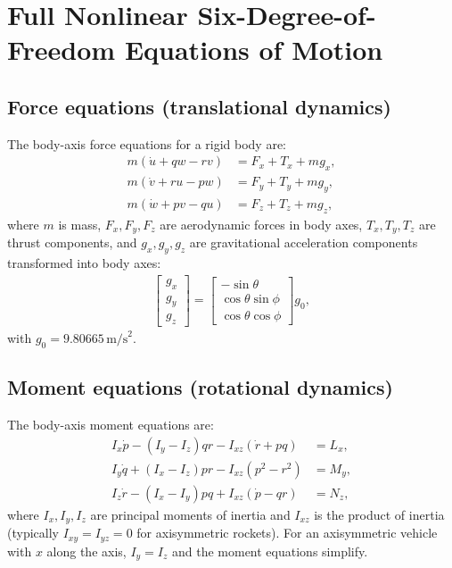 \documentclass[11pt]{article}
\begin{document}
\section{Full Nonlinear Six-Degree-of-Freedom Equations of Motion}

\subsection{Force equations (translational dynamics)}
The body-axis force equations for a rigid body are:
\begin{align}
m(\dot u + qw - rv) &= F_x + T_x + m g_x,\\
m(\dot v + ru - pw) &= F_y + T_y + m g_y,\\
m(\dot w + pv - qu) &= F_z + T_z + m g_z,
\end{align}
where $m$ is mass, $F_x, F_y, F_z$ are aerodynamic forces in body axes, $T_x, T_y, T_z$ are thrust components, and $g_x, g_y, g_z$ are gravitational acceleration components transformed into body axes:
\begin{align}
\begin{bmatrix}g_x\\g_y\\g_z\end{bmatrix}
=
\begin{bmatrix}
-\sin\theta\\
\cos\theta\sin\phi\\
\cos\theta\cos\phi
\end{bmatrix}g_0,
\end{align}
with $g_0=9.80665\,\text{m/s}^2$.

\subsection{Moment equations (rotational dynamics)}
The body-axis moment equations are:
\begin{align}
I_x \dot p - (I_y-I_z)qr - I_{xz}(\dot r + pq) &= L_x,\\
I_y \dot q + (I_x-I_z)pr - I_{xz}(p^2-r^2) &= M_y,\\
I_z \dot r - (I_x-I_y)pq + I_{xz}(\dot p - qr) &= N_z,
\end{align}
where $I_x, I_y, I_z$ are principal moments of inertia and $I_{xz}$ is the product of inertia (typically $I_{xy}=I_{yz}=0$ for axisymmetric rockets). For an axisymmetric vehicle with $x$ along the axis, $I_y=I_z$ and the moment equations simplify.
\end{document}
